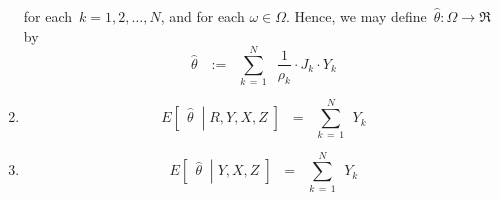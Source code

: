 \begin{proposition}
\begin{enumerate}
	for each \,$k = 1, 2, \ldots, N$, and for each $\omega \in \Omega$.
	\vskip 0.05cm
	\noindent
	Hence, we may define
	\,$\widehat{\theta} : \Omega \longrightarrow \Re$\,
	by
	\begin{equation*}
	\widehat{\theta}
	\,\;\; := \;\;
		\overset{N}{\underset{k\,=\,1}{\sum}}\;\;
		\dfrac{1}{\rho_{k}} \cdot J_{k} \cdot Y_{k}
	\end{equation*}
\item
	\begin{equation*}
	E\!\left[\;\,\left.\widehat{\theta}\;\;\right\vert\;R,Y,X,Z\;\right]
	\;\; = \;\;
		\overset{N}{\underset{k\,=\,1}{\sum}}\;\, Y_{k}	
	\end{equation*}
\item
	\begin{equation*}
	E\!\left[\;\,\left.\widehat{\theta}\;\;\right\vert\;Y,X,Z\;\right]
	\;\; = \;\;
		\overset{N}{\underset{k\,=\,1}{\sum}}\;\, Y_{k}	
	\end{equation*}
\end{enumerate}
\end{proposition}
\proof
